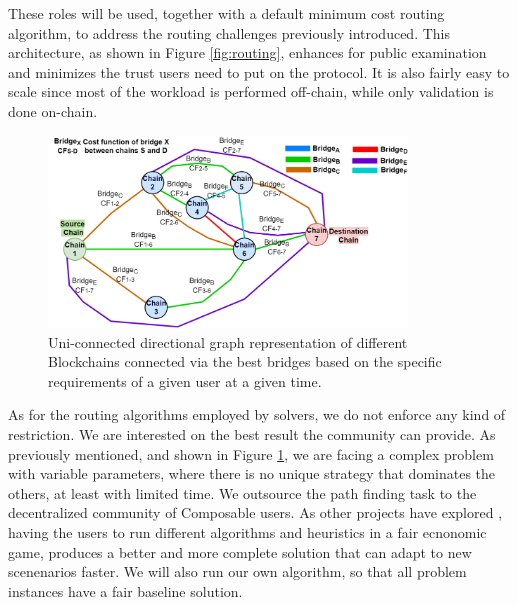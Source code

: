These roles will be used, together with a default minimum cost routing algorithm, to address the routing challenges previously introduced. This architecture, as shown in Figure \ref{fig:routing}, enhances for public examination and minimizes the trust users need to put on the protocol. It is also fairly easy to scale since most of the workload is performed off-chain, while only validation is done on-chain.

\begin{figure}[ht]
    \centering
    \includegraphics[width=0.85\textwidth]{images/Selected_Bridges1.png}
    \caption{Uni-connected directional graph representation of different Blockchains connected via the best bridges based on the specific requirements of a given user at a given time.}
    \label{fig:sel_bridges}
\end{figure}

As for the routing algorithms employed by solvers, we do not enforce any kind of restriction. We are interested on the best result the community can provide. As previously mentioned, and shown in Figure \ref{fig:sel_bridges}, we are facing a complex problem with variable parameters, where there is no unique strategy that dominates the others, at least with limited time. We outsource the path finding task to the decentralized community of Composable users. As other projects have explored \cite{GnosisWhitepaper}, having the users to run different algorithms and heuristics in a fair ecnonomic game, produces a better and more complete solution that can adapt to new scenenarios faster. We will also run our own algorithm, so that all problem instances have a fair baseline solution.